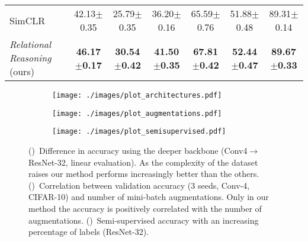 \documentclass{article}
\begin{document}
\begin{table}[t!]
\begin{adjustbox}{width=\columnwidth,center}
\begin{tabular}{lcccccc}
    SimCLR \citep{chen2020simple} & 
    42.13$\pm$\small{0.35} & 25.79$\pm$\small{0.35} & 36.20$\pm$\small{0.16} & 65.59$\pm$\small{0.76} & 51.88$\pm$\small{0.48} & 89.31$\pm$\small{0.14} \\  
    \emph{Relational Reasoning} (ours)  & \textbf{46.17$\pm$\small{0.17}} & \textbf{30.54$\pm$\small{0.42}} & \textbf{41.50$\pm$\small{0.35}} & \textbf{67.81$\pm$\small{0.42}} & \textbf{52.44$\pm$\small{0.47}} & \textbf{89.67$\pm$\small{0.33}} \\
    \bottomrule
  \end{tabular}
 \end{adjustbox}
\end{table}

\begin{figure}[t!]
    \begin{subfigure}[t]{0.333\textwidth}
        \texttt{[image: ./images/plot\_architectures.pdf]}
        \caption{}
        \label{fig:results-architectures}
    \end{subfigure}\begin{subfigure}[t]{0.333\textwidth}
        \centering
        \texttt{[image: ./images/plot\_augmentations.pdf]}
        \caption{}
        \label{fig:results-augmentations}
    \end{subfigure}
    \begin{subfigure}[t]{0.333\textwidth}
        \centering
        \texttt{[image: ./images/plot\_semisupervised.pdf]}
        \caption{}
        \label{fig:results-semisupervised}
    \end{subfigure}
    \caption{()~Difference in accuracy using the deeper backbone (Conv4$\rightarrow$ResNet-32, linear evaluation). As the complexity of the dataset raises our method performs increasingly better than the others. ()~Correlation between validation accuracy (3 seeds, Conv-4, CIFAR-10) and number of mini-batch augmentations. Only in our method the accuracy is positively correlated with the number of augmentations. ()~Semi-supervised accuracy with an increasing percentage of labels (ResNet-32).}
    \label{fig:results}
\end{figure}
\end{document}
